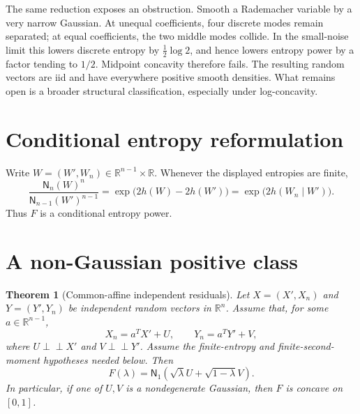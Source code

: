 \documentclass[11pt]{article}
\newtheorem{theorem}{Theorem}
\newcommand{\R}{\mathbb R}
\newcommand{\N}{\mathsf N}
\newcommand{\ind}{\mathrel{\perp\!\!\!\perp}}
\begin{document}
The same reduction exposes an obstruction. Smooth a Rademacher variable by a
very narrow Gaussian. At unequal coefficients, four discrete modes remain
separated; at equal coefficients, the two middle modes collide. In the
small-noise limit this lowers discrete entropy by $\tfrac12\log2$, and hence
lowers entropy power by a factor tending to $1/2$. Midpoint concavity
therefore fails. The resulting random vectors are iid and have everywhere
positive smooth densities. What remains open is a broader structural
classification, especially under log-concavity.

\section{Conditional entropy reformulation}

Write $W=(W',W_n)\in\R^{n-1}\times\R$. Whenever the displayed entropies are
finite,
\begin{equation}\label{eq:conditional}
 \frac{\N_n(W)^n}{\N_{n-1}(W')^{n-1}}
 =\exp\bigl(2h(W)-2h(W')\bigr)
 =\exp\bigl(2h(W_n\mid W')\bigr).
\end{equation}
Thus $F$ is a conditional entropy power.

\section{A non-Gaussian positive class}

\begin{theorem}[Common-affine independent residuals]\label{thm:positive}
Let $X=(X',X_n)$ and $Y=(Y',Y_n)$ be independent random vectors in $\R^n$.
Assume that, for some $a\in\R^{n-1}$,
\[
 X_n=a^T X'+U,\qquad Y_n=a^T Y'+V,
\]
where $U\ind X'$ and $V\ind Y'$. Assume the finite-entropy and finite-second-
moment hypotheses needed below. Then
\begin{equation}\label{eq:residual-reduction}
 F(\lambda)=\N_1(\sqrt\lambda U+\sqrt{1-\lambda}V).
\end{equation}
In particular, if one of $U,V$ is a nondegenerate Gaussian, then $F$ is
concave on $[0,1]$.
\end{theorem}
\end{document}
